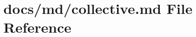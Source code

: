 \hypertarget{collective_8md}{}\section{docs/md/collective.md File Reference}
\label{collective_8md}

